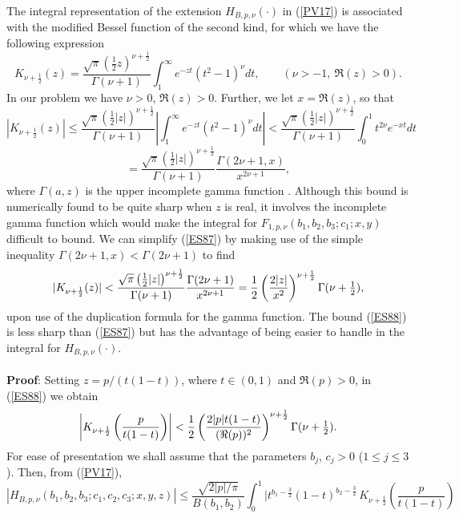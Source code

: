 The integral representation of the extension $H_{B,p,\nu}(\cdot)$ in (\ref{PV17}) is associated with the modified Bessel function of the second kind, for which we have the following expression \cite[(10.32.8)]{AB26}
\[ K_{\nu+\frac{1}{2}}(z)=\frac{\sqrt{\pi}\left(\frac{1}{2}z\right)^{\nu+\frac{1}{2}}}{\Gamma(\nu+1)}\int_{1}^{\infty}e^{-zt}(t^{2}-1)^{\nu}dt,\qquad(\nu>-1,\ \Re (z)>0).
\]
In our problem we have $\nu>0$, $\Re(z)>0$. Further, we let $x=\Re(z)$, so that
\[| K_{\nu+\frac{1}{2}}(z)|\leq\frac{\sqrt{\pi}\left(\frac{1}{2}|z|\right)^{\nu+\frac{1}{2}}}{\Gamma(\nu+1)}\left|\int_{1}^{\infty}e^{-zt}(t^{2}-1)^{\nu}dt\right|<\frac{\sqrt{\pi}\left(\frac{1}{2}|z|\right)^{\nu+\frac{1}{2}}}{\Gamma(\nu+1)} \int_0^1 t^{2\nu}e^{-xt} dt \]
\begin{equation}\label{ES87}
=\frac{\sqrt{\pi}\left(\frac{1}{2}|z|\right)^{\nu+\frac{1}{2}}}{\Gamma(\nu+1)}\frac{\Gamma(2\nu+1,x)}{x^{2\nu+1}},
\end{equation}
where $\Gamma(a,z)$ is the upper incomplete gamma function \cite[(8.2.2)]{AB26}. Although this bound is numerically found to be quite sharp when $z $ is real, it involves the incomplete gamma function which would make the integral for $F_{1,p,\nu}(b_{1},b_{2},b_{3};c_{1};x,y)$ difficult to bound. We can simplify (\ref{ES87}) by making use of the simple inequality $\Gamma(2\nu+1,x)<\Gamma(2\nu+1)$ to find
\begin{equation}\label{ES88}
| K_{\nu+\frac{1}{2}}(z)|<\frac{\sqrt{\pi}\left(\frac{1}{2}|z|\right)^{\nu+\frac{1}{2}}}{\Gamma(\nu+1)}\frac{\Gamma(2\nu+1)}{x^{2\nu+1}}
=\frac{1}{2}\left(\frac{2|z|}{x^{2}}\right)^{\nu+\frac{1}{2}}\Gamma(\nu+\mbox{${\textstyle \frac{1}{2}}$}),
\end{equation}
upon use of the duplication formula for the gamma function. The bound (\ref{ES88}) is less sharp than (\ref{ES87}) but has the advantage of being easier to handle in the integral for $H_{B,p,\nu}(\cdot)$. 
\\
\\
\noindent
\textbf{Proof}: Setting $z=p/(t(1-t))$, where $t\in(0,1)$ and $\Re(p)>0$, in (\ref{ES88}) we obtain
\[
\left| K_{\nu+\frac{1}{2}}\left(\frac{p}{t(1-t)}\right)\right|<\frac{1}{2}\left(\frac{2|p|t(1-t)}{(\Re (p))^{2}}\right)^{\nu+\frac{1}{2}}\Gamma(\nu+\mbox{${\textstyle \frac{1}{2}}$}).
\]
For ease of presentation we shall assume that the parameters $b_j$, $c_j>0$ ($1\leq j\leq 3$). Then, from (\ref{PV17}),
\[|H_{B,p,\nu}(b_1, b_2, b_3;c_1,c_2,c_3;x,y,z)|
\leq \frac{\sqrt{2|p|/\pi}}{B(b_1,b_2)}\int_0^1\bigg|t^{b_1-\frac{3}{2}}(1-t)^{b_2-\frac{3}{2}} \,K_{\nu+\frac{1}{2}}\left(\frac{p}{t(1-t)}\right)\]
